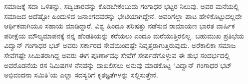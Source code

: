 {ಸಮಾಜಕ್ಕೆ ಸದಾ ಒಳಿತನ್ನು, ಸದ್ವಿಚಾರವನ್ನು ಕೊಡಬೇಕೆಂಬುದು ಗಂಗಾಧರ ಭಟ್ಟರ ನಿಲುವು. ಅವರ ಮನೆಯಲ್ಲಿ ಸಮಾಜದ ಅದೆಷ್ಟೋ ಹಿಂದುಳಿದ ಜನಾಂಗದವರನ್ನು ಭೇಟಿಯಾಗಿದ್ದೇನೆ. ಅವರಿಗೆಲ್ಲಾ ಪಾಟ ಹೇಳಿಕೊಟ್ಟುದಲ್ಲದೇ  ಆರ್ಥಿಕ\-ವಾಗಿಯೂ ಸಹಾಯ ಮಾಡಿದ್ದಾರೆ. ವಿಶ್ವ ಹಿಂದೂ ಪರಿಷತ್ತು ನಡೆಸುವ ರಾಮಾಯಣ  \enginline{-}  ಭಾರತ ವಾರ್ಷಿಕ ಪರೀಕ್ಷೆಯ ಮೌಲ್ಯಮಾಪನಕ್ಕೆ ನನ್ನ ಹೆಂಡತಿಯನ್ನು ಕರೆಯಲು ಎಂದೂ ಮರೆಯು\-ತ್ತಿರಲಿಲ್ಲ.   ಬಹುಮುಖ ಪ್ರತಿಭೆಯ ವಿದ್ವಾನ್ ಗಂಗಾಧರ ಭಟ್ ಅವರು ಸರ್ಕಾರದ ಸೇವೆಯಿಂದಷ್ಟೇ ನಿವೃತ್ತರಾಗುತ್ತಿರುವುದು. ಅರೆಕಾಲಿಕಾ ಸಮಾಜ ಸೇವೆಗಷ್ಟೇ ಸೀಮಿತರಾಗಿದ್ದ ಅವರು ಈಗ ಪೂರ್ಣಾವಧಿ ಸೇವೆಗೆ ಸೇರ್ಪಡೆಗೊಳ್ಳುವ ಈ ಶುಭ ಸಂದರ್ಭ\-ದಲ್ಲಿ ಅವರೊಡನೆಯ ರಸ ನಿಮಿಷಗಳ ನೆನಪನ್ನು ದಾಖಲಿಸಲು ಅನುವು ಮಾಡಕೊಟ್ಟ ‘ವಿದ್ವಾನ್ ಗಂಗಾಧರ ಭಟ್ ಅಭಿವಂದನಾ ಸಮಿತಿ’ಯ ಎಲ್ಲಾ ಸದಸ್ಯರಿಗೆ ಕೃತಜ್ಞತೆಗಳನ್ನು ಸಲ್ಲಿಸುತ್ತೇನೆ.                 

\articleend
}
